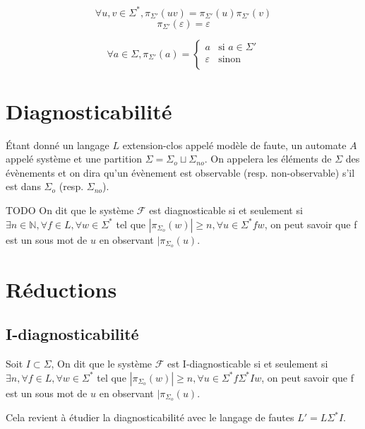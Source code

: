 \documentclass[10pt,a4paper]{article}
\begin{document}
$$\forall u,v \in \Sigma^*, \pi_{\Sigma'}(uv)=\pi_{\Sigma'}(u)\pi_{\Sigma'}(v)$$
$$\pi_{\Sigma'}(\varepsilon)=\varepsilon$$

$$\forall a\in \Sigma,\pi_{\Sigma'}(a)=\left\{\begin{array}{ll}
a &\text{si } a\in \Sigma'\\
\varepsilon &\text{sinon} \\
\end{array}\right.$$

\section{Diagnosticabilit\'e}

\'Etant donn\'e un langage $L$ extension-clos appel\'e mod\`ele de faute, un automate $A$ appel\'e syst\`eme et une partition $\Sigma=\Sigma_o\sqcup \Sigma_{no}$. On appelera les \'el\'ements de $\Sigma$ des \'ev\`enements et on dira qu'un \'ev\`enement est observable (resp. non-observable) s'il est dans $\Sigma_o$ (resp. $\Sigma_{no}$).

TODO On dit que le système $\mathcal F$ est diagnosticable si et seulement si $\exists n \in \mathbb N, \forall  f \in L, \forall w \in \Sigma^*$ tel que $|\pi_{\Sigma_o}(w)| \geq n, \forall u \in \Sigma^* f w$, on peut savoir que f est un sous mot de $u$ en observant $|\pi_{\Sigma_o}(u)$. 


\section{R\'eductions}

\subsection{I-diagnosticabilit\'e}


Soit $I \subset \Sigma$, On dit que le système $\mathcal F$ est I-diagnosticable si et seulement si $\exists n, \forall  f \in L, \forall w \in \Sigma^*$ tel que $|\pi_{\Sigma_o}(w)| \geq n, \forall u \in \Sigma^*f \Sigma^* I w$, on peut savoir que f est un sous mot de $u$ en observant $|\pi_{\Sigma_o}(u)$. 


Cela revient à étudier la diagnosticabilité avec le langage de fautes $L'=L \Sigma^* I$.

\end{document}
